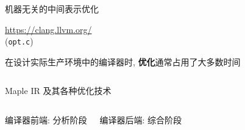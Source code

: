 \begin{frame}{}
  \begin{center}

    \vspace{0.50cm}
    机器无关的中间表示优化
  \end{center}
\end{frame}

\begin{frame}{}
  \begin{center}

    \vspace{0.30cm}
    \url{https://clang.llvm.org/}\\[5pt]
    (\texttt{opt.c})
  \end{center}
\end{frame}

\begin{frame}{}
  \begin{center}
    在设计实际生产环境中的编译器时, {\bf 优化}通常占用了大多数时间
  \end{center}

  \begin{columns}
  \end{columns}

  \vspace{0.50cm}
  \begin{center}
    Maple IR 及其各种优化技术
  \end{center}
\end{frame}

\begin{frame}{}
  \begin{columns}
      \begin{center}
        编译器前端: 分析阶段
      \end{center}
      \begin{center}
        编译器后端: 综合阶段
      \end{center}
  \end{columns}
\end{frame}

